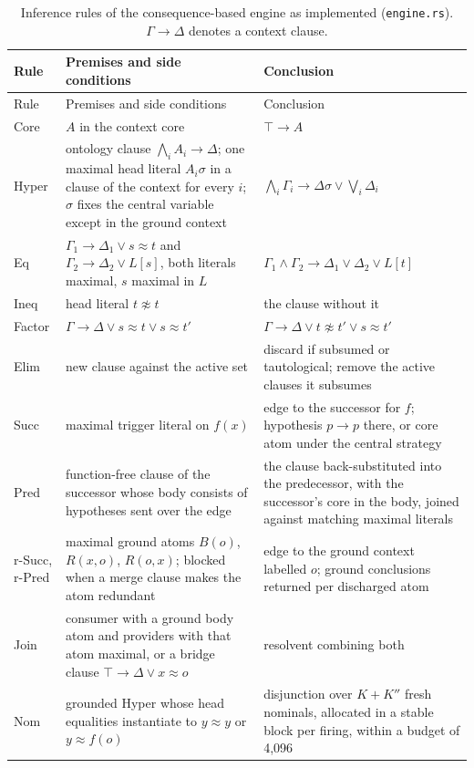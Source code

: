 \begin{small}
\begin{longtable}{@{}p{}p{}p{}@{}}
\caption{Inference rules of the consequence-based engine as implemented
(\texttt{engine.rs}).  $\Gamma\rightarrow\Delta$ denotes a context clause.}
\label{tab:rules-cb}\\
\toprule
Rule & Premises and side conditions & Conclusion\\
\midrule
\endfirsthead
\toprule
Rule & Premises and side conditions & Conclusion\\
\midrule
\endhead
Core & $A$ in the context core & $\top\rightarrow A$\\
Hyper & ontology clause $\bigwedge_i A_i\rightarrow\Delta$; one maximal head literal $A_i\sigma$ in a clause of the context for every $i$; $\sigma$ fixes the central variable except in the ground context & $\bigwedge_i\Gamma_i\rightarrow\Delta\sigma\vee\bigvee_i\Delta_i$\\
Eq & $\Gamma_1\rightarrow\Delta_1\vee s\approx t$ and $\Gamma_2\rightarrow\Delta_2\vee L[s]$, both literals maximal, $s$ maximal in $L$ & $\Gamma_1\wedge\Gamma_2\rightarrow\Delta_1\vee\Delta_2\vee L[t]$\\
Ineq & head literal $t\not\approx t$ & the clause without it\\
Factor & $\Gamma\rightarrow\Delta\vee s\approx t\vee s\approx t'$ & $\Gamma\rightarrow\Delta\vee t\not\approx t'\vee s\approx t'$\\
Elim & new clause against the active set & discard if subsumed or tautological; remove the active clauses it subsumes\\
Succ & maximal trigger literal on $f(x)$ & edge to the successor for $f$; hypothesis $p\rightarrow p$ there, or core atom under the central strategy\\
Pred & function-free clause of the successor whose body consists of hypotheses sent over the edge & the clause back-substituted into the predecessor, with the successor's core in the body, joined against matching maximal literals\\
r-Succ, r-Pred & maximal ground atoms $B(o)$, $R(x,o)$, $R(o,x)$; blocked when a merge clause makes the atom redundant & edge to the ground context labelled $o$; ground conclusions returned per discharged atom\\
Join & consumer with a ground body atom and providers with that atom maximal, or a bridge clause $\top\rightarrow\Delta\vee x\approx o$ & resolvent combining both\\
Nom & grounded Hyper whose head equalities instantiate to $y\approx y$ or $y\approx f(o)$ & disjunction over $K+K''$ fresh nominals, allocated in a stable block per firing, within a budget of 4,096\\
\bottomrule
\end{longtable}
\end{small}

